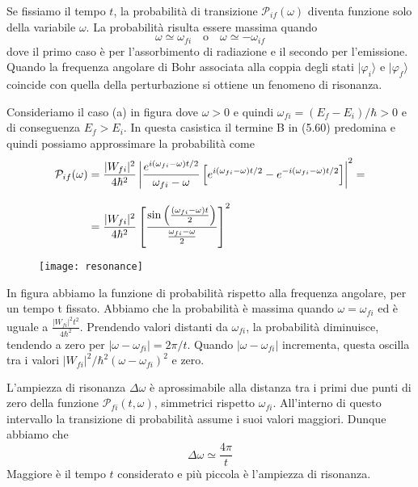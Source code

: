 Se fissiamo il tempo $t$, la probabilit\`a di transizione $\mathcal{P}_{if}(\omega)$ diventa funzione solo della variabile $\omega$. La probabilit\`a risulta essere massima quando 
\begin{equation*}
	\omega \simeq \omega_{fi} \quad \text{o} \quad \omega \simeq - \omega_{if}
\end{equation*}
dove il primo caso \`e per l'assorbimento di radiazione e il secondo per l'emissione. Quando la frequenza angolare di Bohr associata alla coppia degli stati $|\varphi_i \rangle$ e $|\varphi_f \rangle$ coincide con quella della perturbazione si ottiene un fenomeno di risonanza.

Consideriamo il caso (a) in figura dove $\omega >0 $ e quindi $\omega_{fi} = (E_{f}-E_i)/\hbar >0$ e di conseguenza $E_{f} > E_i$. In questa casistica il termine B in (5.60) predomina e quindi possiamo approssimare la probabilit\`a come 
\begin{align}
	\mathcal{P}_{if}(\omega) & = \frac{|W_{fi}|^2}{4 \hbar^2} \left | \frac{e^{i(\omega_{fi}-\omega)t/2}}{\omega_{fi}-\omega} \left[ e^{i(\omega_{fi}-\omega)t/2}-e^{-i(\omega_{fi}-\omega)t/2}\right]\right|^2 = \notag \\[0.3cm]
	& = \frac{|W_{fi}|^2}{4 \hbar^2}  \left[ \frac{\sin\left( \frac{(\omega_{fi}-\omega)t}{2}\right)}{\frac{\omega_{fi}-\omega}{2}} \right]^2
\end{align}
\begin{figure}[!ht]
\vspace{0.1in}
\texttt{[image: resonance]}	
\centering
\end{figure}

In figura abbiamo la funzione di probabilit\`a rispetto alla frequenza angolare, per un tempo t fissato. Abbiamo che la probabilit\`a \`e massima quando $\omega = \omega_{fi}$ ed \`e uguale a $\frac{|W_{fi}|^2t^2}{4 \hbar^2}  $. Prendendo valori distanti da $\omega_{fi}$, la probabilit\`a diminuisce, tendendo a zero per $|\omega - \omega_{fi}|= 2 \pi /t$. Quando $|\omega-\omega_{fi}|$ incrementa, questa oscilla tra i valori $|W_{fi}|^2/\hbar^2(\omega-\omega_{fi})^2$ e zero. 

L'ampiezza di risonanza $\Delta \omega $ \`e aprossimabile alla distanza tra i primi due punti di zero della funzione $\mathcal{P}_{fi}(t,\omega)$, simmetrici rispetto $\omega_{fi}$. All'interno di questo intervallo la transizione di probabilit\`a assume i suoi valori maggiori. Dunque abbiamo che
\begin{equation}
	\Delta \omega \simeq \frac{4 \pi}{t}
\end{equation}
Maggiore \`e il tempo $t$ considerato e pi\`u piccola \`e l'ampiezza di risonanza.

